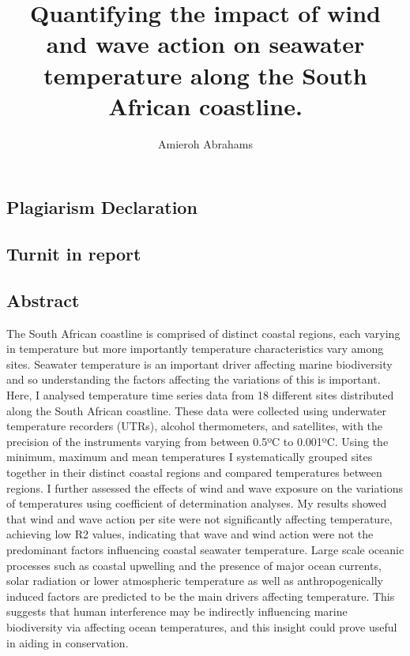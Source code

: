 \documentclass[12pt,a4paper,]{article}
\title{Quantifying the impact of wind and wave action on seawater temperature
along the South African coastline.}
\author{Amieroh Abrahams}
\date{}
\begin{document}
\maketitle

{
\setcounter{tocdepth}{4}
\tableofcontents
}
\newpage

\hypertarget{plagiarism-declaration}{%
\subsection{Plagiarism Declaration}\label{plagiarism-declaration}}

\newpage

\hypertarget{turnit-in-report}{%
\subsection{Turnit in report}\label{turnit-in-report}}

\newpage

\hypertarget{abstract}{%
\subsection{Abstract}\label{abstract}}

The South African coastline is comprised of distinct coastal regions,
each varying in temperature but more importantly temperature
characteristics vary among sites. Seawater temperature is an important
driver affecting marine biodiversity and so understanding the factors
affecting the variations of this is important. Here, I analysed
temperature time series data from 18 different sites distributed along
the South African coastline. These data were collected using underwater
temperature recorders (UTRs), alcohol thermometers, and satellites, with
the precision of the instruments varying from between 0.5ºC to 0.001ºC.
Using the minimum, maximum and mean temperatures I systematically
grouped sites together in their distinct coastal regions and compared
temperatures between regions. I further assessed the effects of wind and
wave exposure on the variations of temperatures using coefficient of
determination analyses. My results showed that wind and wave action per
site were not significantly affecting temperature, achieving low R2
values, indicating that wave and wind action were not the predominant
factors influencing coastal seawater temperature. Large scale oceanic
processes such as coastal upwelling and the presence of major ocean
currents, solar radiation or lower atmospheric temperature as well as
anthropogenically induced factors are predicted to be the main drivers
affecting temperature. This suggests that human interference may be
indirectly influencing marine biodiversity via affecting ocean
temperatures, and this insight could prove useful in aiding in
conservation.
\end{document}
